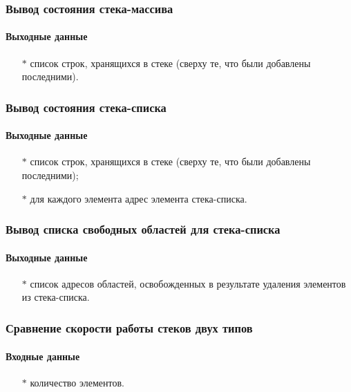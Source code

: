 \documentclass[a4paper,12pt]{extarticle}
\begin{document}
\subsubsection{Вывод состояния стека-массива}

\paragraph{Выходные данные}
\begin{itemize}
    \item[$*$] список строк, хранящихся в стеке (сверху те, что были добавлены последними).
\end{itemize}


\subsubsection{Вывод состояния стека-списка}

\paragraph{Выходные данные}
\begin{itemize}
    \item[$*$] список строк, хранящихся в стеке (сверху те, что были добавлены последними);
    \item[$*$] для каждого элемента адрес элемента стека-списка.
\end{itemize}


\subsubsection{Вывод списка свободных областей для стека-списка}

\paragraph{Выходные данные}
\begin{itemize}
    \item[$*$] список адресов областей, освобожденных в результате удаления элементов из стека-списка.
\end{itemize}


\subsubsection{Сравнение скорости работы стеков двух типов}


\paragraph{Входные данные}
\begin{itemize}
    \item[$*$] количество элементов.
\end{itemize}
\end{document}
